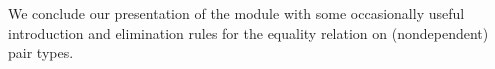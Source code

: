 We conclude our presentation of the  module with some occasionally useful introduction and elimination rules for the equality relation on (nondependent) pair types.
\ccpad
\begin{code}%
\>[0]\AgdaSpace{}%
\AgdaSymbol{:}%
\>[102I]\AgdaSymbol{\{}\AgdaSpace{}%
\AgdaSpace{}%
\AgdaSymbol{:}\AgdaSpace{}%
\AgdaSpace{}%
\AgdaSymbol{\}\{}\AgdaSpace{}%
\AgdaSpace{}%
\AgdaSymbol{:}\AgdaSpace{}%
\AgdaSpace{}%
\AgdaSymbol{\}}\AgdaSpace{}%
\AgdaSpace{}%
\AgdaSymbol{(}\AgdaSpace{}%
\AgdaOperator{\AgdaInductiveConstructor{,}}\AgdaSpace{}%
\AgdaSymbol{)}\AgdaSpace{}%
\AgdaSpace{}%
\AgdaSymbol{(}\AgdaSpace{}%
\AgdaOperator{\AgdaInductiveConstructor{,}}\AgdaSpace{}%
\AgdaSymbol{)}\AgdaSpace{}%
\AgdaSpace{}%
\AgdaSpace{}%
\AgdaSpace{}%
\<%
\\
%
\>[0]\AgdaSpace{}%
\AgdaSpace{}%
\AgdaSymbol{=}\AgdaSpace{}%
\AgdaSpace{}%
\AgdaSpace{}%
\<%
\end{code}
\scpad
\begin{code}%
\>[0]\AgdaSpace{}%
\AgdaSymbol{:}%
\>[105I]\AgdaSymbol{\{}\AgdaSpace{}%
\AgdaSpace{}%
\AgdaSymbol{:}\AgdaSpace{}%
\AgdaSpace{}%
\AgdaSymbol{\}\{}\AgdaSpace{}%
\AgdaSpace{}%
\AgdaSymbol{:}\AgdaSpace{}%
\AgdaSpace{}%
\AgdaSymbol{\}}\AgdaSpace{}%
\AgdaSpace{}%
\AgdaSymbol{(}\AgdaSpace{}%
\AgdaOperator{\AgdaInductiveConstructor{,}}\AgdaSpace{}%
\AgdaSymbol{)}\AgdaSpace{}%
\AgdaSpace{}%
\AgdaSymbol{(}\AgdaSpace{}%
\AgdaOperator{\AgdaInductiveConstructor{,}}\AgdaSpace{}%
\AgdaSymbol{)}\AgdaSpace{}%
\AgdaSpace{}%
\AgdaSpace{}%
\AgdaSpace{}%
\<%
\\
%
\>[0]\AgdaSpace{}%
\AgdaSpace{}%
\AgdaSymbol{=}\AgdaSpace{}%
\AgdaSpace{}%
\AgdaSpace{}%
\<%
\end{code}
